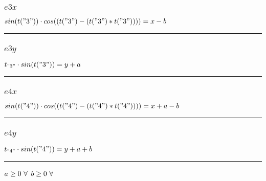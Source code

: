 \documentclass[11pt]{article}
\begin{document}
\subsubsection*{$e3x$}
$
 sin(t("3"))  \cdot  cos((t("3") - (t("3") * t("3"))))  = x - b
$
\vspace{5pt}
\hrule
\subsubsection*{$e3y$}
$
t_{"3"} \cdot  sin(t("3"))  = y + a
$
\vspace{5pt}
\hrule
\subsubsection*{$e4x$}
$
 sin(t("4"))  \cdot  cos((t("4") - (t("4") * t("4"))))  = x + a - b
$
\vspace{5pt}
\hrule
\subsubsection*{$e4y$}
$
t_{"4"} \cdot  sin(t("4"))  = y + a + b
$
\vspace{5pt}
\hrule
\bigskip
$a\geq 0 ~ \forall \\$
$b\geq 0 ~ \forall \\$
\end{document}
